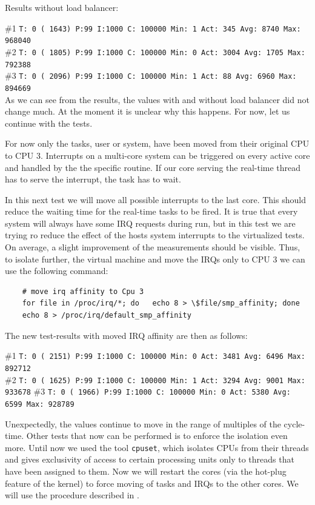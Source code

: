 \documentclass[]{scrartcl}
\begin{document}
\noindent Results without load balancer:

\noindent \small \#1 \texttt{T: 0 ( 1643) P:99 I:1000 C: 100000 Min: 1 Act:  345 Avg: 8740 Max:  968040}\\
\noindent \small \#2 \texttt{T: 0 ( 1805) P:99 I:1000 C: 100000 Min: 0 Act: 3004 Avg: 1705 Max:  792388}\\
\noindent \small \#3 \texttt{T: 0 ( 2096) P:99 I:1000 C: 100000 Min: 1 Act:   88 Avg: 6960 Max:  894669}\\

As we can see from the results, the values with and without load balancer did not change much.
At the moment it is unclear why this happens. For now, let us continue with the tests.

For now only the tasks, user or system, have been moved from their original CPU to CPU 3. 
Interrupts on a multi-core system can be triggered on every active core and handled by the the specific routine. If our core serving the real-time thread has to serve the interrupt, the task has to wait.

In this next test we will move all possible interrupts to the last core. This should reduce the waiting time for the real-time tasks to be fired.
It is true that every system will always have some IRQ requests during run, but in this test we are trying ro reduce the effect of the hosts system interrupts to the virtualized tests.
On average, a slight improvement of the measurements should be visible.
Thus, to isolate further, the virtual machine and move the IRQs only to CPU 3 we can use the following command: 

\begin{verbatim}
	# move irq affinity to Cpu 3
	for file in /proc/irq/*; do   echo 8 > \$file/smp_affinity; done
	echo 8 > /proc/irq/default_smp_affinity
\end{verbatim}

\noindent The new test-results with moved IRQ affinity are then as follows:
 
\noindent \small \#1 \texttt{T: 0 ( 2151) P:99 I:1000 C: 100000 Min: 0 Act: 3481 Avg: 6496 Max:  892712}\\
\noindent \small \#2 \texttt{T: 0 ( 1625) P:99 I:1000 C: 100000 Min: 1 Act: 3294 Avg: 9001 Max:  933678}
\noindent \small \#3 \texttt{T: 0 ( 1966) P:99 I:1000 C: 100000 Min: 0 Act: 5380 Avg: 6599 Max:  928789}

Unexpectedly, the values continue to move in the range of multiples of the cycle-time. 
Other tests that now can be performed is to enforce the isolation even more. 
Until now we used the tool \texttt{cpuset}, which isolates CPUs from their threads and gives exclusivity of access to certain processing units only to threads that have been assigned to them.
Now we will restart the cores (via the hot-plug feature of the kernel) to force moving of tasks and IRQs to the other cores. We will use the procedure described in \cite{lrt02}.
\end{document}
